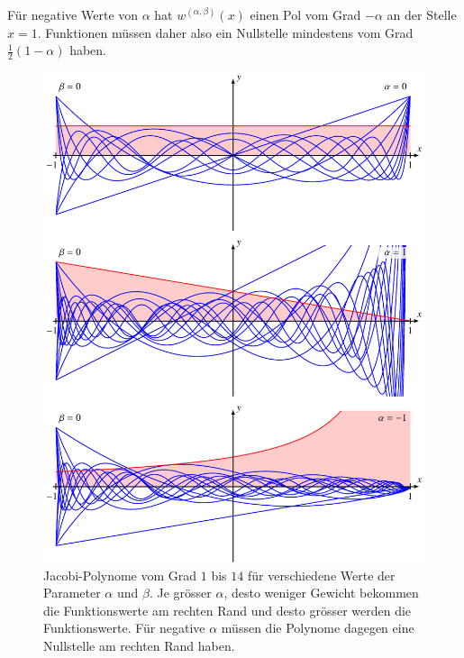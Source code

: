Für negative Werte von $\alpha$ hat $w^{(\alpha,\beta)}(x)$ einen
Pol vom Grad $-\alpha$ an der Stelle $x=1$.
Funktionen müssen daher also ein Nullstelle mindestens vom Grad
$\frac12(1-\alpha)$ haben.

\begin{figure}
\centering
\includegraphics[width=\textwidth]{chapters/070-orthogonalitaet/images/jacobi.pdf}
\caption{Jacobi-Polynome vom Grad $1$ bis $14$ für verschiedene Werte
der Parameter $\alpha$ und $\beta$.
Je grösser $\alpha$, desto weniger Gewicht bekommen die Funktionswerte am
rechten Rand und desto grösser werden die Funktionswerte.
Für negative $\alpha$ müssen die Polynome dagegen eine Nullstelle am
rechten Rand haben.
\label{buch:orthogonal:fig:jacobi-parameter}}
\end{figure}

